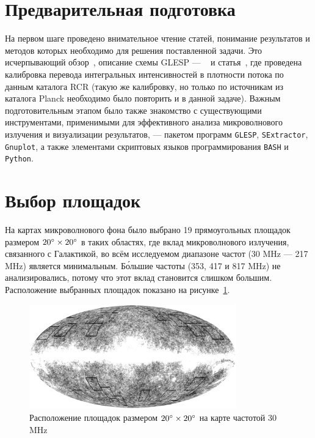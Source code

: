 \documentclass[12pt,a4paper]{extarticle}
\begin{document}
\section{Предварительная подготовка}
На первом шаге проведено внимательное чтение статей, понимание результатов и методов которых необходимо для решения поставленной задачи. Это исчерпывающий обзор~\cite{overview_Verkhodanov:2016}, описание схемы GLESP --- ~\cite{GLESP:2005} и статья~\cite{Verkhodanov_etal:2015}, где проведена калибровка перевода интегральных интенсивностей в плотности потока по данным каталога RCR (такую же калибровку, но только по источникам из каталога Planck необходимо было повторить и в данной задаче). Важным подготовительным этапом было также знакомство с существующими инструментами, применимыми для эффективного анализа микроволнового излучения и визуализации результатов, --- пакетом программ \texttt{GLESP}, \texttt{SExtractor}, \texttt{Gnuplot}, а также элементами скриптовых языков программирования \texttt{BASH} и \texttt{Python}. 

\section{Выбор площадок}
На картах микроволнового фона было выбрано 19 прямоугольных площадок размером $20\degree \times 20\degree$ в таких областях, где вклад микроволнового излучения, связанного с Галактикой, во всём исследуемом диапазоне частот (30 MHz --- 217 MHz) является минимальным. Б\'{о}льшие частоты (353, 417 и 817 MHz) не анализировались, потому что этот вклад становится слишком большим. Расположение выбранных площадок показано на рисунке~\ref{big_areas}.
	\begin{figure}[h!]
		\begin{center}
			\includegraphics[width=0.8\textwidth]{areas_030_wb}
			\caption{Расположение площадок размером $20\degree \times 20\degree$ на карте частотой 30 MHz}
			\label{big_areas}
		\end{center}
	\end{figure}
\end{document}
